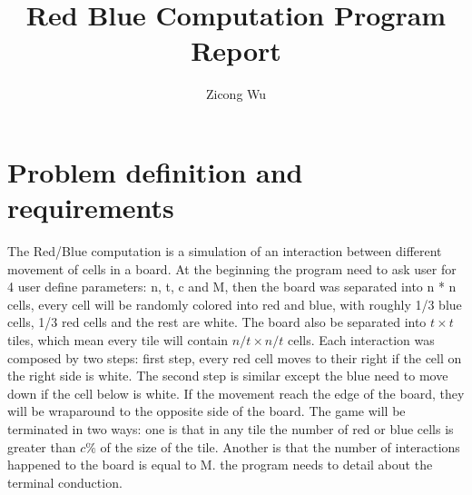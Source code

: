 \documentclass[12pt]{article}
\title{Red Blue Computation Program Report}
\author{\textup{Zicong Wu}}
\date{\teday}
\begin{document}
    
    \tableofcontents
    \newpage

\section{Problem definition and requirements}
The Red/Blue computation is a simulation of an interaction between different movement of cells in a board. 
At the beginning the program need to ask user for 4 user define parameters: n, t, c and M, then the board was separated into n * n cells, every cell will be randomly colored into red and blue, with roughly 1/3 blue cells, 1/3 red cells and the rest are white. The board also be separated into $t \times t$ tiles, which mean every tile will contain $n/t \times n/t$ cells.
Each interaction was composed by two steps: first step, every red cell moves to their right if the cell on the right side is white. The second step is similar except the blue need to move down if the cell below is white. If the movement reach the edge of the board, they will be wraparound to the opposite side of the board.
The game will be terminated in two ways: one is that in any tile the number of red or blue cells is greater than $c\%$ of the size of the tile. Another is that the number of interactions happened to the board is equal to M. the program needs to detail about the terminal conduction.
\end{document}
